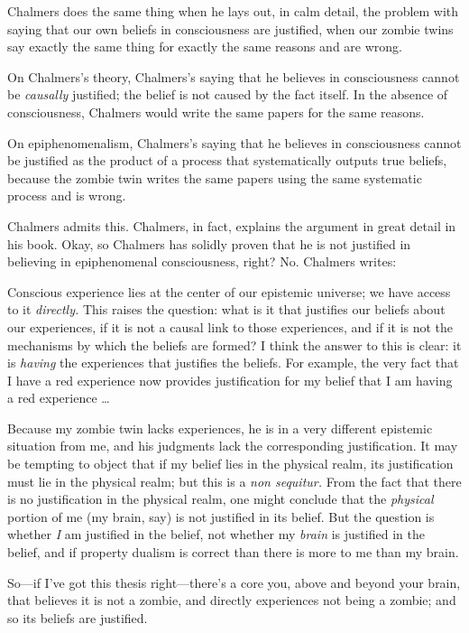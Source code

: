 {
 Chalmers does the same thing when he lays out, in calm detail, the
problem with saying that our own beliefs in consciousness are
justified, when our zombie twins say exactly the same thing for exactly
the same reasons and are wrong.}

{
 On Chalmers's theory, Chalmers's
saying that he believes in consciousness cannot be \textit{causally}
justified; the belief is not caused by the fact itself. In the absence
of consciousness, Chalmers would write the same papers for the same
reasons.}

{
 On epiphenomenalism, Chalmers's saying that he
believes in consciousness cannot be justified as the product of a
process that systematically outputs true beliefs, because the zombie
twin writes the same papers using the same systematic process and is
wrong.}

{
 Chalmers admits this. Chalmers, in fact, explains the argument in
great detail in his book. Okay, so Chalmers has solidly proven that he
is not justified in believing in epiphenomenal consciousness, right?
No. Chalmers writes:}

{
 Conscious experience lies at the center of our epistemic universe;
we have access to it \textit{directly.} This raises the question: what
is it that justifies our beliefs about our experiences, if it is not a
causal link to those experiences, and if it is not the mechanisms by
which the beliefs are formed? I think the answer to this is clear: it
is \textit{having} the experiences that justifies the beliefs. For
example, the very fact that I have a red experience now provides
justification for my belief that I am having a red experience \ldots}

{
 Because my zombie twin lacks experiences, he is in a very
different epistemic situation from me, and his judgments lack the
corresponding justification. It may be tempting to object that if my
belief lies in the physical realm, its justification must lie in the
physical realm; but this is a \textit{non sequitur.} From the fact that
there is no justification in the physical realm, one might conclude
that the \textit{physical} portion of me (my brain, say) is not
justified in its belief. But the question is whether \textit{I} am
justified in the belief, not whether my \textit{brain} is justified in
the belief, and if property dualism is correct than there is more to me
than my brain.}

{
 So---if I've got this thesis
right---there's a core you, above and beyond your
brain, that believes it is not a zombie, and directly experiences not
being a zombie; and so its beliefs are justified.}

